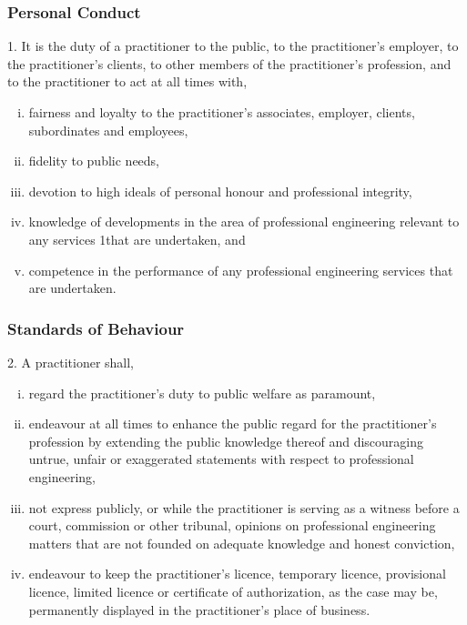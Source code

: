 \begin{frame}
\frametitle{Personal Conduct}

1. It is the duty of a practitioner to the public, to the practitioner's employer, to the practitioner's clients, to other members of the practitioner's profession, and to the practitioner to act at all times with,

\begin{enumerate}[i)]
\item fairness and loyalty to the practitioner's associates, employer, clients, subordinates and employees,

\item fidelity to public needs,

\item devotion to high ideals of personal honour and professional integrity,

\item knowledge of developments in the area of professional engineering relevant to any services 1that are undertaken, and

\item competence in the performance of any professional engineering services that are undertaken.
\end{enumerate}


\end{frame}



\begin{frame}
\frametitle{Standards of Behaviour}

2. A practitioner shall,

\begin{enumerate}[i)]
\item regard the practitioner's duty to public welfare as paramount,

\item endeavour at all times to enhance the public regard for the practitioner's profession by extending the public knowledge thereof and discouraging untrue, unfair or exaggerated statements with respect to professional engineering,

\item not express publicly, or while the practitioner is serving as a witness before a court, commission or other tribunal, opinions on professional engineering matters that are not founded on adequate knowledge and honest conviction,

\item endeavour to keep the practitioner's licence, temporary licence, provisional licence, limited licence or certificate of authorization, as the case may be, permanently displayed in the practitioner's place of business.
\end{enumerate}

\end{frame}



